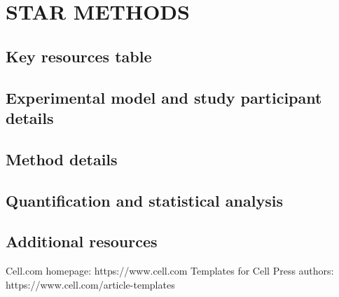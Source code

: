\documentclass[12pt,letterpaper]{article}
\begin{document}
\newpage


\bigskip

\newpage
\section*{STAR METHODS}


\subsection*{Key resources table}


\subsection*{Experimental model and study participant details}


\subsection*{Method details}


\subsection*{Quantification and statistical analysis}



\subsection*{Additional resources}


Cell.com homepage: https://www.cell.com
\newline Templates for Cell Press authors: https://www.cell.com/article-templates


\end{document}

